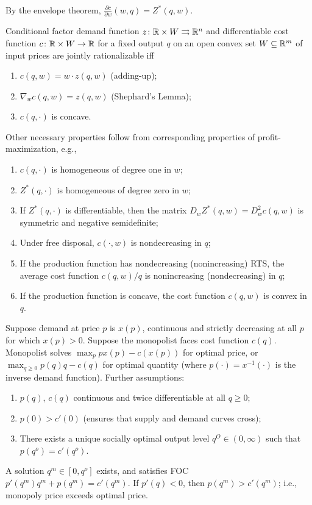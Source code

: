 \documentclass[8pt,letterpaper, landscape]{extarticle} %
\begin{document}
\begin{multicols}{3}
\begin{description}
By the envelope theorem, $ \frac{\partial c}{\partial w} (w,q) = Z^* (q,w) $.

 Conditional factor demand function $ z \colon \mathbb{R} \times W \rightrightarrows \mathbb{R}^n $ and differentiable cost function $ c \colon \mathbb{R} \times W \to \mathbb{R} $ for a fixed output $ q $ on an open convex set $ W \subseteq \mathbb{R}^m $ of input prices are jointly rationalizable iff
\begin{enumerate}
\item $ c(q,w) = w \cdot z(q,w) $ (adding-up);
\item $ \nabla_w c(q,w) = z(q,w) $ (Shephard's Lemma);
\item $ c(q, \cdot) $ is concave.
\end{enumerate}
Other necessary properties follow from corresponding properties of profit-maximization, e.g.,
\begin{enumerate}
\item $ c(q, \cdot) $ is homogeneous of degree one in $ w $;
\item $ Z^*(q, \cdot) $ is homogeneous of degree zero in $ w $;
\item If $ Z^*(q, \cdot) $ is differentiable, then the matrix $ D_w Z^* (q,w) = D_w^2 c(q,w) $ is symmetric and negative semidefinite;
\item Under free disposal, $ c( \cdot ,w) $ is nondecreasing in $ q $;
\item If the production function has nondecreasing (nonincreasing) RTS, the average cost function $ c(q,w)/q $ is nonincreasing (nondecreasing) in $ q $;
\item If the production function is concave, the cost function $ c(q,w) $ is convex in $ q $.
\end{enumerate}

 Suppose demand at price $ p $ is $ x(p) $, continuous and strictly decreasing at all $ p $ for which $ x(p) > 0 $. Suppose the monopolist faces cost function $ c(q) $. Monopolist solves $ \max_p px(p) - c(x(p)) $ for optimal price, or $ \max_{q \geq 0} p(q) q - c(q) $ for optimal quantity (where $ p(\cdot) = x^{-1} (\cdot) $ is the inverse demand function). Further assumptions:
\begin{enumerate}
\item $ p(q) $, $ c(q) $ continuous and twice differentiable at all $ q \geq 0 $;
\item $ p(0) > c'(0) $ (ensures that supply and demand curves cross);
\item There exists a unique socially optimal output level $ q^O \in (0, \infty) $ such that $ p(q^o) = c'(q^o) $.
\end{enumerate}
A solution $ q^m \in [0 , q^o] $ exists, and satisfies FOC $ p'(q^m)q^m + p(q^m) = c'(q^m) $. If $ p'(q) < 0 $, then $ p(q^m) > c'(q^m) $; i.e., monopoly price exceeds optimal price.


\end{description}
\end{multicols}
\end{document}
